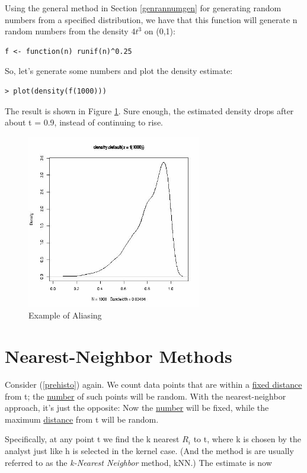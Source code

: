 Using the general method in Section \ref{genrannumgen} for generating
random numbers from a specified distribution, we have that this
function will generate n random numbers from the density $4t^3$ on
(0,1):

\begin{lstlisting}
f <- function(n) runif(n)^0.25
\end{lstlisting}

So, let's generate some numbers and plot the density estimate:

\begin{lstlisting}
> plot(density(f(1000)))
\end{lstlisting}

The result is shown in Figure \ref{alias}.  Sure enough, the estimated
density drops after about t = 0.9, instead of continuing to rise.

\begin{figure}[tb] 
\centerline{
\includegraphics[width=3.0in]{Alias.jpg} 
}
\caption{Example of Aliasing}
\label{alias}  
\end{figure}

\section{Nearest-Neighbor Methods}

Consider (\ref{prehisto}) again.  We count data points that are
within a \underline{fixed distance} from t; the \underline{number} of
such points will be random.  With the nearest-neighbor approach, it's
just the opposite:  Now the \underline{number} will be fixed, while the
maximum \underline{distance} from t will be random.

Specifically, at any point t we find the k nearest $R_i$ to t, where k
is chosen by the analyst just like h is selected in the kernel case.
(And the method is are usually referred to as the {\it k-Nearest
Neighbor} method, kNN.)  The estimate is now

